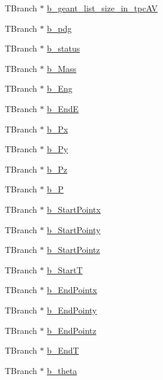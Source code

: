 \begin{DoxyCompactItemize}
T\-Branch $\ast$ \hyperlink{classanatree_a2fe631d23ec23018bb07c1df4dc5a086}{b\-\_\-geant\-\_\-list\-\_\-size\-\_\-in\-\_\-tpc\-A\-V}
\item 
T\-Branch $\ast$ \hyperlink{classanatree_a6ce3421042e93cbabce4cf9b911493e3}{b\-\_\-pdg}
\item 
T\-Branch $\ast$ \hyperlink{classanatree_a487bfb75aa043108e21fded2b86bbe61}{b\-\_\-status}
\item 
T\-Branch $\ast$ \hyperlink{classanatree_a4835ac5ebfbbd9949152d78786854fa4}{b\-\_\-\-Mass}
\item 
T\-Branch $\ast$ \hyperlink{classanatree_ad4dcfa13b890ce03a9227f2d1ec6ccb2}{b\-\_\-\-Eng}
\item 
T\-Branch $\ast$ \hyperlink{classanatree_ab5d2fc7e9d5738fd4ac62337b5f1d46f}{b\-\_\-\-End\-E}
\item 
T\-Branch $\ast$ \hyperlink{classanatree_ac76749a68f213e1d8dde5ce2c7e8e811}{b\-\_\-\-Px}
\item 
T\-Branch $\ast$ \hyperlink{classanatree_a3d43b3415c74db22248342ef0e592b71}{b\-\_\-\-Py}
\item 
T\-Branch $\ast$ \hyperlink{classanatree_ad9c991283dc6b579be6a58a264b005d6}{b\-\_\-\-Pz}
\item 
T\-Branch $\ast$ \hyperlink{classanatree_aecb071fd667576c8b7414a8f1ea7ed32}{b\-\_\-\-P}
\item 
T\-Branch $\ast$ \hyperlink{classanatree_aa45a25dc13a2b4ce708a270193a3f0d2}{b\-\_\-\-Start\-Pointx}
\item 
T\-Branch $\ast$ \hyperlink{classanatree_a2db436cd83b5f17a916f07c775ce0fce}{b\-\_\-\-Start\-Pointy}
\item 
T\-Branch $\ast$ \hyperlink{classanatree_abc639192c52cdbf85c2929857906c1cc}{b\-\_\-\-Start\-Pointz}
\item 
T\-Branch $\ast$ \hyperlink{classanatree_ad4ccd3d5373e12128c7512166daa3998}{b\-\_\-\-Start\-T}
\item 
T\-Branch $\ast$ \hyperlink{classanatree_a9011b8bd3d90df4d24de2fc1d4b46080}{b\-\_\-\-End\-Pointx}
\item 
T\-Branch $\ast$ \hyperlink{classanatree_a7de38448b77ece82a62f049fc1272f4f}{b\-\_\-\-End\-Pointy}
\item 
T\-Branch $\ast$ \hyperlink{classanatree_aa33e37eb87d52df5b803506bdfe09fe2}{b\-\_\-\-End\-Pointz}
\item 
T\-Branch $\ast$ \hyperlink{classanatree_a52b183a10db57477742a139d2ed6a119}{b\-\_\-\-End\-T}
\item 
T\-Branch $\ast$ \hyperlink{classanatree_a8e8c26faab89d08eb047360ab1737e5f}{b\-\_\-theta}

\end{DoxyCompactItemize}
